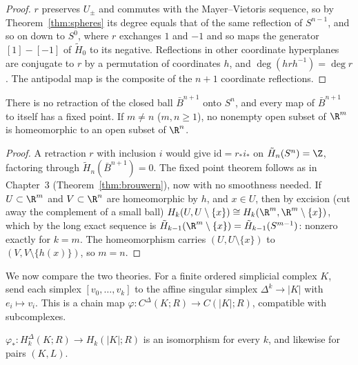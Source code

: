 \begin{proof}
$r$ preserves $U_\pm$ and commutes with the Mayer--Vietoris sequence, so by Theorem~\ref{thm:spheres} its degree equals that of the same reflection of $S^{n-1}$, and so on down to $S^0$, where $r$
exchanges $1$ and $-1$ and so maps the generator $[1]-[-1]$ of $\tilde H_0$ to its negative. Reflections in other coordinate hyperplanes are conjugate to $r$ by a permutation of coordinates $h$, and
$\deg(hrh^{-1})=\deg r$. The antipodal map is the composite of the $n+1$ coordinate reflections.
\end{proof}

\begin{corollary}\label{cor:brouwerH}
There is no retraction of the closed ball $\bar B^{n+1}$ onto $S^n$, and every map of $\bar B^{n+1}$ to itself has a fixed point. If $m\ne n$ ($m,n\ge1$), no nonempty open subset of $\R^m$ is homeomorphic to an open
subset of $\R^n$.
\end{corollary}

\begin{proof}
A retraction $r$ with inclusion $i$ would give $\mathrm{id}=r_*i_*$ on $\tilde H_n(S^n)=\Z$, factoring through $\tilde H_n(\bar B^{n+1})=0$. The fixed point theorem follows as in Chapter~3
(Theorem~\ref{thm:brouwern}), now with no smoothness needed. If $U\subset\R^m$ and $V\subset\R^n$ are homeomorphic by $h$, and $x\in U$, then by excision (cut away the complement of a small ball)
$H_k(U,U\setminus\{x\})\cong H_k(\R^m,\R^m\setminus\{x\})$, which by the long exact sequence is $\tilde H_{k-1}(\R^m\setminus\{x\})=\tilde H_{k-1}(S^{m-1})$: nonzero exactly for $k=m$. The homeomorphism carries
$(U,U\setminus\{x\})$ to $(V,V\setminus\{h(x)\})$, so $m=n$.
\end{proof}

We now compare the two theories. For a finite ordered simplicial complex $K$, send each simplex $[v_0,\dots,v_k]$ to the affine singular simplex $\Delta^k\to|K|$ with $e_i\mapsto v_i$. This is a chain map
$\varphi\colon C^\Delta(K;R)\to C(|K|;R)$, compatible with subcomplexes.

\begin{theorem}\label{thm:simplicialsingular}
$\varphi_*\colon H^\Delta_k(K;R)\to H_k(|K|;R)$ is an isomorphism for every $k$, and likewise for pairs $(K,L)$.
\end{theorem}

